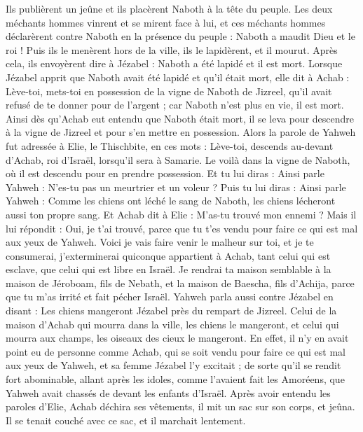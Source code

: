 \begin{multicols}{2}
Ils publièrent un jeûne et ils placèrent Naboth à la tête du peuple.
Les deux méchants hommes vinrent et se mirent face à lui, et ces méchants hommes déclarèrent contre Naboth en la présence du peuple : Naboth a maudit Dieu et le roi ! Puis ils le menèrent hors de la ville, ils le lapidèrent, et il mourut.
Après cela, ils envoyèrent dire à Jézabel : Naboth a été lapidé et il est mort.
Lorsque Jézabel apprit que Naboth avait été lapidé et qu'il était mort, elle dit à Achab : Lève-toi, mets-toi en possession de la vigne de Naboth de Jizreel, qu'il avait refusé de te donner pour de l'argent ; car Naboth n'est plus en vie, il est mort.
Ainsi dès qu'Achab eut entendu que Naboth était mort, il se leva pour descendre à la vigne de Jizreel et pour s'en mettre en possession.
Alors la parole de Yahweh fut adressée à Elie, le Thischbite, en ces mots :
Lève-toi, descends au-devant d'Achab, roi d'Israël, lorsqu'il sera à Samarie. Le voilà dans la vigne de Naboth, où il est descendu pour en prendre possession.
Et tu lui diras : Ainsi parle Yahweh : N'es-tu pas un meurtrier et un voleur ? Puis tu lui diras : Ainsi parle Yahweh : Comme les chiens ont léché le sang de Naboth, les chiens lécheront aussi ton propre sang.
Et Achab dit à Elie : M'as-tu trouvé mon ennemi ? Mais il lui répondit : Oui, je t'ai trouvé, parce que tu t'es vendu pour faire ce qui est mal aux yeux de Yahweh.
Voici je vais faire venir le malheur sur toi, et je te consumerai, j'exterminerai quiconque appartient à Achab, tant celui qui est esclave, que celui qui est libre en Israël.
Je rendrai ta maison semblable à la maison de Jéroboam, fils de Nebath, et la maison de Baescha, fils d'Achija, parce que tu m'as irrité et fait pécher Israël.
Yahweh parla aussi contre Jézabel en disant : Les chiens mangeront Jézabel près du rempart de Jizreel.
Celui de la maison d'Achab qui mourra dans la ville, les chiens le mangeront, et celui qui mourra aux champs, les oiseaux des cieux le mangeront.
En effet, il n'y en avait point eu de personne comme Achab, qui se soit vendu pour faire ce qui est mal aux yeux de Yahweh, et sa femme Jézabel l'y excitait ;
de sorte qu'il se rendit fort abominable, allant après les idoles, comme l'avaient fait les Amoréens, que Yahweh avait chassés de devant les enfants d'Israël.
Après avoir entendu les paroles d'Elie, Achab déchira ses vêtements, il mit un sac sur son corps, et jeûna. Il se tenait couché avec ce sac, et il marchait lentement.

\end{multicols}
